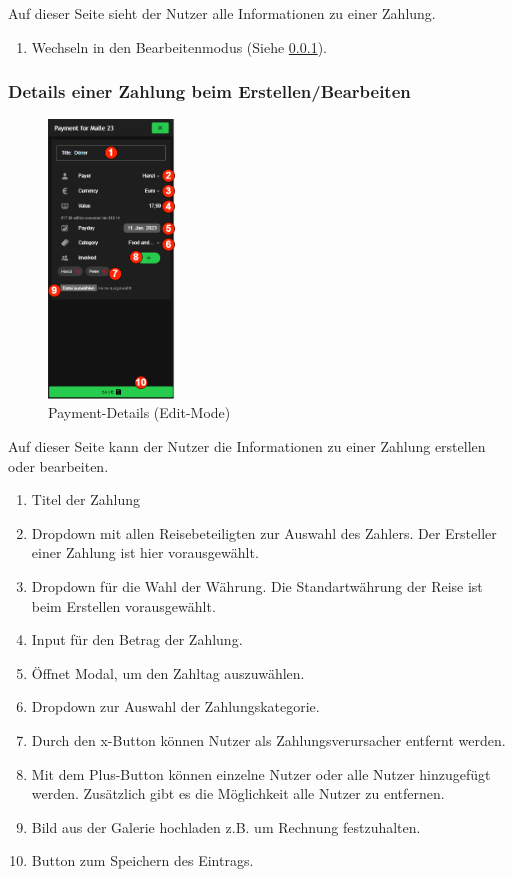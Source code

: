 Auf dieser Seite sieht der Nutzer alle Informationen zu einer Zahlung.

\begin{enumerate}[label=\protect\circled{\arabic*}]
	\item Wechseln in den Bearbeitenmodus (Siehe \ref{payment-details_(edit-mode)}).
\end{enumerate}

\subsubsection{Details einer Zahlung beim Erstellen/Bearbeiten}\label{payment-details_(edit-mode)}
\begin{figure}[H]
	\centering
	\includegraphics[width=0.3\textwidth]{img/pages_numbers/payment-details_(edit-mode).drawio}
	\caption[Payment-Details (Edit-Mode)]{Payment-Details (Edit-Mode)}
	\label{fig:payment-details_(edit-mode)}
\end{figure}

Auf dieser Seite kann der Nutzer die Informationen zu einer Zahlung erstellen oder bearbeiten.

\begin{enumerate}[label=\protect\circled{\arabic*}]
	\item Titel der Zahlung
	\item Dropdown mit allen Reisebeteiligten zur Auswahl des Zahlers. Der Ersteller einer Zahlung ist hier 			vorausgewählt.
	\item Dropdown für die Wahl der Währung. Die Standartwährung der Reise ist beim Erstellen vorausgewählt.
	\item Input für den Betrag der Zahlung.
	\item Öffnet Modal, um den Zahltag auszuwählen.
	\item Dropdown zur Auswahl der Zahlungskategorie.
	\item Durch den x-Button können Nutzer als Zahlungsverursacher entfernt werden.
	\item Mit dem Plus-Button können einzelne Nutzer oder alle Nutzer hinzugefügt werden. Zusätzlich gibt es die Möglichkeit alle Nutzer zu entfernen.
	\item Bild aus der Galerie hochladen z.B. um Rechnung festzuhalten.
	\item Button zum Speichern des Eintrags.
\end{enumerate}


